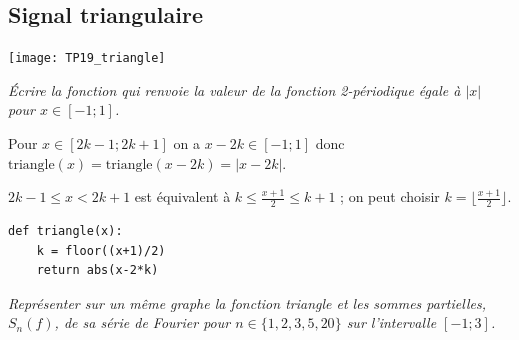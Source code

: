 \subsection{Signal triangulaire}
\begin{center}
\texttt{[image: TP19\_triangle]}
\end{center}
\begin{Exercise}\it
Écrire la fonction  qui renvoie la valeur de la fonction 2-périodique égale à $|x|$ pour $x\in[-1;1]$.
\end{Exercise}
\begin{Answer} 

Pour $x\in [2k-1;2k+1]$ on a $x-2k\in [-1;1]$ donc
$\text{triangle}(x)  = \text{triangle}(x-2k)  = |x-2k|$.

$2k-1\le x < 2k+1$ est équivalent à $k \le \frac{x+1}2 \le k+1$ ; on peut choisir $k = \big\lfloor \frac{x+1}2 \big\rfloor$.
    
\begin{lstlisting}
def triangle(x):
    k = floor((x+1)/2)
    return abs(x-2*k)
\end{lstlisting}
\end{Answer}
\begin{Exercise}\it
Représenter sur un même graphe la fonction triangle et les sommes partielles, $S_n(f)$, de sa série de Fourier pour $n\in \{1, 2, 3, 5, 20\}$ sur l'intervalle $[-1;3]$.
\end{Exercise}
